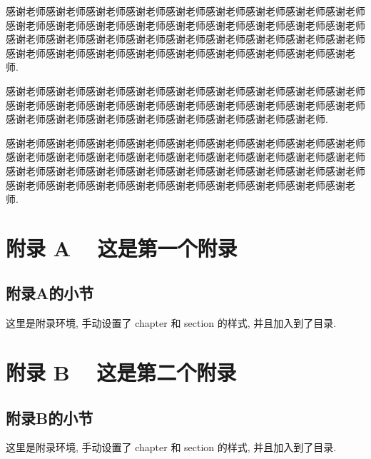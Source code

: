 \documentclass{shnuthesis}
\begin{document}
\begin{thankpage}
\setlength{\baselineskip}{24pt}

感谢老师感谢老师感谢老师感谢老师感谢老师感谢老师感谢老师感谢老师感谢老师感谢老师感谢老师感谢老师感谢老师感谢老师感谢老师感谢老师感谢老师感谢老师感谢老师感谢老师感谢老师感谢老师感谢老师感谢老师感谢老师感谢老师感谢老师感谢老师感谢老师感谢老师感谢老师感谢老师感谢老师感谢老师感谢老师感谢老师.

感谢老师感谢老师感谢老师感谢老师感谢老师感谢老师感谢老师感谢老师感谢老师感谢老师感谢老师感谢老师感谢老师感谢老师感谢老师感谢老师感谢老师感谢老师感谢老师感谢老师感谢老师感谢老师感谢老师感谢老师感谢老师感谢老师.

感谢老师感谢老师感谢老师感谢老师感谢老师感谢老师感谢老师感谢老师感谢老师感谢老师感谢老师感谢老师感谢老师感谢老师感谢老师感谢老师感谢老师感谢老师感谢老师感谢老师感谢老师感谢老师感谢老师感谢老师感谢老师感谢老师感谢老师感谢老师感谢老师感谢老师感谢老师感谢老师感谢老师感谢老师感谢老师感谢老师.


\end{thankpage}



\appendix

\renewcommand{\chaptermark}[1]{\markboth{#1}{}}
\chapter{附录 A ~ 这是第一个附录}
\renewcommand{\thesection}{A.\arabic{section}}
\section{附录A的小节}

这里是附录环境, 手动设置了 chapter 和 section 的样式, 并且加入到了目录.

\chapter{附录 B ~ 这是第二个附录}
\renewcommand{\thesection}{B.\arabic{section}}
\section{附录B的小节}

这里是附录环境, 手动设置了 chapter 和 section 的样式, 并且加入到了目录.
\end{document}
